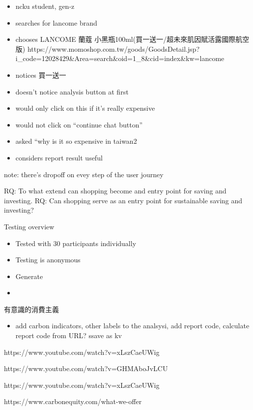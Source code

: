 \documentclass[
  letterpaper,
  DIV=11,
  numbers=noendperiod]{scrartcl}
\providecommand{\tightlist}{%
  \setlength{\itemsep}{0pt}\setlength{\parskip}{0pt}}\usepackage{longtable,booktabs,array}
\begin{document}
\begin{itemize}
\tightlist
\item
  ncku student, gen-z
\item
  searches for lancome brand
\item
  chooses LANCOME 蘭蔻 小黑瓶100ml(買一送一/超未來肌因賦活露國際航空版)
  https://www.momoshop.com.tw/goods/GoodsDetail.jsp?i\_code=12028429\&Area=search\&oid=1\_8\&cid=index\&kw=lancome
\item
  notices 買一送一
\item
  doesn't notice analysis button at first
\item
  would only click on this if it's really expensive
\item
  would not click on ``continue chat button''
\item
  asked ``why is it so expensive in taiwan2
\item
  considers report result useful
\end{itemize}

note: there's dropoff on evey step of the user journey

RQ: To what extend can shopping become and entry point for saving and
investing. RQ: Can shopping serve as an entry point for sustainable
saving and investing?

Testing overview

\begin{itemize}
\tightlist
\item
  Tested with 30 participants individually
\item
  Testing is anonymous
\item
  Generate
\item
\end{itemize}

有意識的消費主義

\begin{itemize}
\tightlist
\item
  add carbon indicators, other labels to the analsysi, add report code,
  calculate report code from URL? ssave as kv
\end{itemize}

https://www.youtube.com/watch?v=xLszCaeUWig

https://www.youtube.com/watch?v=GHMAboJvLCU

https://www.youtube.com/watch?v=xLszCaeUWig

https://www.carbonequity.com/what-we-offer

\newpage

\newpage

\newpage


\renewcommand\refname{References}
  
\end{document}
